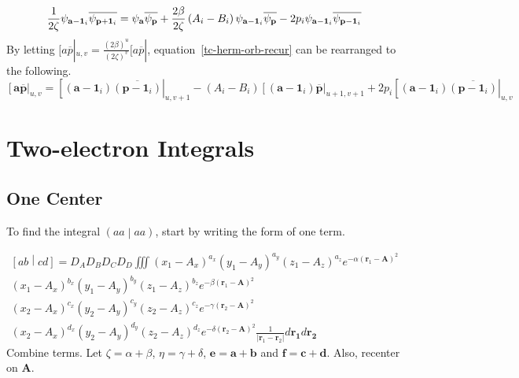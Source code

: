 \documentclass[twoside,10pt,draft]{article}
\begin{document}
\begin{equation}
  \frac{1}{2\zeta}\psi_{\mathbf{a} - \mathbf{1}_i}\overline{\psi_{\mathbf{p} + \mathbf{1}_i}} = \psi_{\mathbf{a}}\overline{\psi_{\mathbf{p}}} + \frac{2\beta}{2\zeta}\left(A_i - B_i\right)\psi_{\mathbf{a} - \mathbf{1}_i}\overline{\psi_{\mathbf{p}}} \\
  - 2p_i\psi_{\mathbf{a} - \mathbf{1}_i}\overline{\psi_{\mathbf{p} - \mathbf{1}_i}}
  \label{tc-herm-orb-recur}
\end{equation}
By letting $[a\overline{p}|_{u,v} = \frac{(2\beta)^u}{(2\zeta)^v}[a\overline{p}|$, equation~\ref{tc-herm-orb-recur} can be rearranged to the following.
\begin{equation}
  \left[\mathbf{a}\overline{\mathbf{p}}\right|_{u,v} = \left[\left(\mathbf{a} - \mathbf{1}_i\right)\overline{\left(\mathbf{p} - \mathbf{1}_i\right)}\right|_{u,v+1} - \left(A_i - B_i\right)\left[\left(\mathbf{a} - \mathbf{1}_i\right)\overline{\mathbf{p}}\right|_{u+1,v+1} + 2p_i\left[\left(\mathbf{a} - \mathbf{1}_i\right)\overline{\left(\mathbf{p} - \mathbf{1}_i\right)}\right|_{u,v}
  \label{tc-recur}
\end{equation}



\section{Two-electron Integrals}
\subsection{One Center}
To find the integral $\left(aa\middle|aa\right)$, start by writing the form of one term.

\begin{multline}
  \left[ab\middle|cd\right] = D_A D_B D_C D_D \iiint\left(x_1 - A_x\right)^{a_x}\left(y_1 - A_y\right)^{a_y} \left(z_1 - A_z\right)^{a_z} e^{-\alpha\left(\mathbf{r}_1 - \mathbf{A}\right)^2} \\
  \left(x_1 - A_x\right)^{b_x}\left(y_1 - A_y\right)^{b_y} \left(z_1 - A_z\right)^{b_z}  e^{-\beta\left(\mathbf{r}_1 - \mathbf{A}\right)^2} \\
  \left(x_2 - A_x\right)^{c_x}\left(y_2 - A_y\right)^{c_y} \left(z_2 - A_z\right)^{c_z} e^{-\gamma\left(\mathbf{r}_2 - \mathbf{A}\right)^2} \\
  \left(x_2 - A_x\right)^{d_x}\left(y_2 - A_y\right)^{d_y} \left(z_2 - A_z\right)^{d_z}  e^{-\delta\left(\mathbf{r}_2 - \mathbf{A}\right)^2} \frac{1}{\left|\mathbf{r}_1 - \mathbf{r}_2\right|} d\mathbf{r_1} d\mathbf{r_2}
  \label{oc-integral}
\end{multline}
Combine terms. Let $\zeta = \alpha + \beta$, $\eta = \gamma + \delta$, $\mathbf{e} = \mathbf{a} + \mathbf{b}$ and $\mathbf{f} = \mathbf{c} + \mathbf{d}$. Also, recenter on $\mathbf{A}$.
\end{document}
